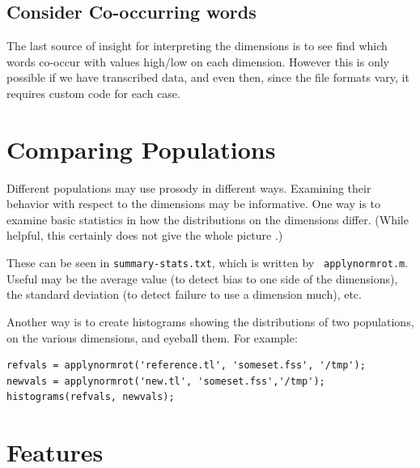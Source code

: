 \documentclass[11pt]{article}
\begin{document}
\subsection{Consider Co-occurring words} 

The last source of insight for interpreting the dimensions is to see
find which words co-occur with values high/low on each dimension.
However this is only possible if we have transcribed data, and even
then, since the file formats vary, it requires custom code for each
case.


\section{Comparing Populations}    \label{sec:subpopulations}

Different populations may use prosody in different ways.  Examining
their behavior with respect to the dimensions may be informative.  One
way is to examine basic statistics in how the distributions on the
dimensions differ.  (While helpful, this certainly does not give the
whole picture \cite{l2english}.)

These can be seen in {\tt summary-stats.txt}, which is written by {\tt
  applynormrot.m}.  Useful may be the average value (to detect bias to
one side of the dimensions), the standard deviation (to detect failure
to use a dimension much), etc.

Another way is to create histograms showing the distributions of two
populations, on the various dimensions, and eyeball them.  For example:

\begin{verbatim}
refvals = applynormrot('reference.tl', 'someset.fss', '/tmp');
newvals = applynormrot('new.tl', 'someset.fss','/tmp');
histograms(refvals, newvals);
\end{verbatim}




\section{Features}               \label{sec:features}
\end{document}
